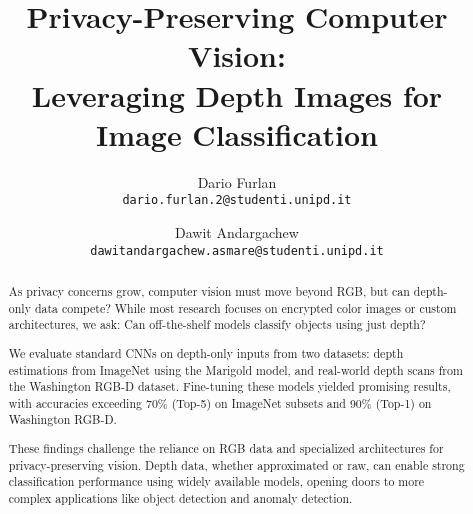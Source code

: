 \documentclass[10pt,twocolumn,letterpaper]{article}
\begin{document}
\title{Privacy-Preserving Computer Vision:\\ Leveraging Depth Images for Image Classification}

\author{Dario Furlan \\
{\tt\small dario.furlan.2@studenti.unipd.it}
\and
Dawit Andargachew\\
{\tt\small  dawitandargachew.asmare@studenti.unipd.it}
}

\maketitle

\begin{abstract}
As privacy concerns grow, computer vision must move beyond RGB, but can depth-only data compete? While most research focuses on encrypted color images or custom architectures, we ask: Can off-the-shelf models classify objects using just depth?

We evaluate standard CNNs on depth-only inputs from two datasets: depth estimations from ImageNet using the Marigold model, and real-world depth scans from the Washington RGB-D dataset. Fine-tuning these models yielded promising results, with accuracies exceeding 70\% (Top-5) on ImageNet subsets and 90\% (Top-1) on Washington RGB-D.

These findings challenge the reliance on RGB data and specialized architectures for privacy-preserving vision. Depth data, whether approximated or raw, can enable strong classification performance using widely available models, opening doors to more complex applications like object detection and anomaly detection.

\end{abstract}








{\small


}
\end{document}
